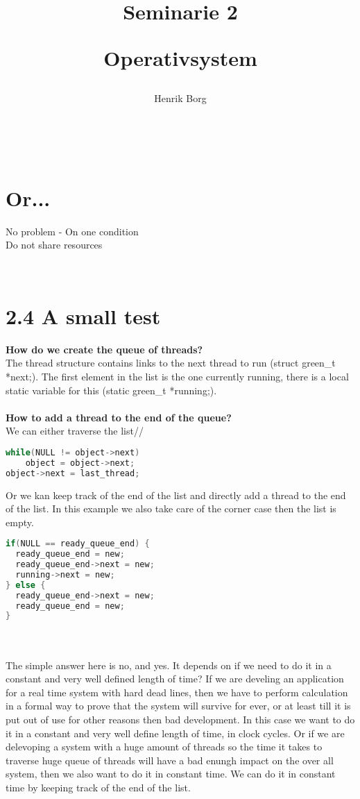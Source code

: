\documentclass[10pt,a4paper]{article}
\title{{\HUGE Seminarie 2}\\ \begin{Large}
Operativsystem
\end{Large}}
\author{Henrik Borg}
\begin{document}
\maketitle
\begin{center}
\\[5\baselineskip]
\section*{Or...}
No problem - On one condition\\
Do not share resources\\
\end{center}

\pagebreak\\


\section*{2.4 A small test}
\textbf{How do we create the queue of threads?}\\
The thread structure contains links to the next thread to run (struct green_t *next;). The first element in the list is the one currently running, there is a local static variable for this (static green_t *running;).\\
\\
\textbf{How to add a thread to the end of the queue?}\\
We can either traverse the list//
\begin{lstlisting}[language=C]
while(NULL != object->next)
	object = object->next;
object->next = last_thread;
\end{lstlisting}
Or we kan keep track of the end of the list and directly add a thread to the end of the list. In this example we also take care of the corner case then the list is empty.
\begin{lstlisting}[language=C]
if(NULL == ready_queue_end) {
  ready_queue_end = new;
  ready_queue_end->next = new;
  running->next = new;
} else {
  ready_queue_end->next = new;
  ready_queue_end = new;
}
\end{lstlisting}
\\
\\
The simple answer here is no, and yes. It depends on if we need to do it in a constant and very well defined length of time? If we are develing an application for a real time system with hard dead lines, then we have to perform calculation in a formal way to prove that the system will survive for ever, or at least till it is put out of use for other reasons then bad development. In this case we want to do it in a constant and very well define length of time, in clock cycles. Or if we are delevoping a system with a huge amount of threads so the time it takes to traverse huge queue of threads will have a bad enungh impact on the over all system, then we also want to do it in constant time. We can do it in constant time by keeping track of the end of the list.\\
\end{document}
